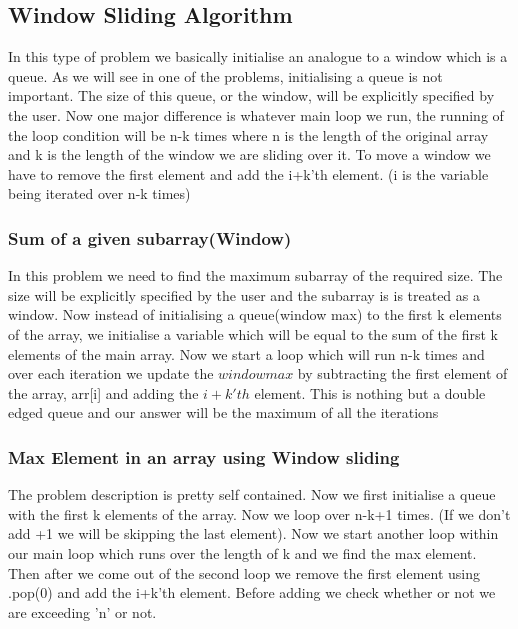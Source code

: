 \documentclass{article}
\begin{document}
\subsection{Window Sliding Algorithm}
In this type of problem we basically initialise an analogue to a window which is a queue. As we will see in one of the problems, initialising a queue is not important. The size of this queue, or the window, will be explicitly specified by the user. Now one major difference is whatever main loop we run, the running of the loop condition will be n-k times where n is the length of the original array and k is the length of the window we are sliding over it. To move a window we have to remove the first element and add the i+k'th element. (i is the variable being iterated over n-k times)

\subsubsection{Sum of a given subarray(Window)}
In this problem we need to find the maximum subarray of the required size. The size will be explicitly specified by the user and the subarray is is treated as a window. Now instead of initialising a queue(window max) to the first k elements of the array, we initialise a variable which will be equal to the sum of the first k elements of the main array. Now we start a loop which will run n-k times and over each iteration we update the $window max$ by subtracting the first element of the array, arr[i] and adding the $i+k'th$ element. This is nothing but a double edged queue and our answer will be the maximum of all the iterations 

\subsubsection{Max Element in an array using Window sliding} 
The problem description is pretty self contained. Now we first initialise a queue with the first k elements of the array. Now we loop over n-k+1 times. (If we don't add +1 we will be skipping the last element). Now we start another loop within our main loop which runs over the length of k and we find the max element. Then after we come out of the second loop we remove the first element using .pop(0) and add the i+k'th element. Before adding we check whether or not we are exceeding 'n' or not. 
\end{document}
